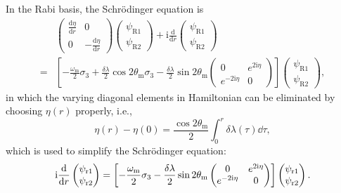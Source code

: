 In the Rabi basis, the Schr\"{o}dinger equation is
\begin{align*}
    &\begin{pmatrix}  \frac{\mathrm d\eta}{\mathrm dr}  & 0 \\ 0 & - \frac{\mathrm d\eta}{\mathrm d r}  \end{pmatrix} \begin{pmatrix} \psi_{\mathrm R1} \\ \psi_{\mathrm R2} \end{pmatrix} + \mathrm i \frac{\mathrm d}{\mathrm dr} \begin{pmatrix} \psi_{\mathrm R1} \\ \psi_{\mathrm R2} \end{pmatrix} \\
    =& \left[ -\frac{\omega_{\mathrm m} }{2} \sigma_3  + \frac{\delta \lambda}{2} \cos 2\theta_{\mathrm m}  \sigma_3  - \frac{\delta \lambda}{2} \sin 2\theta_{\mathrm m} \begin{pmatrix} 0 & e^{2\mathrm i\eta} \\ e^{-2 \mathrm i\eta } & 0 \end{pmatrix}   \right] \begin{pmatrix} \psi_{\mathrm R1} \\ \psi_{\mathrm R2} \end{pmatrix},
\end{align*}
in which the varying diagonal elements in Hamiltonian can be eliminated by choosing $\eta(r)$ properly, i.e.,
\begin{equation}
    \eta(r) - \eta(0) =  \frac{\cos 2\theta_{\mathrm{m}}}{2} \int_0^r \delta\lambda (\tau) \dd\tau,
\end{equation}
which is used to simplify the Schr\"{o}dinger equation:
\begin{equation}
    \ri \frac{\dd}{\dd r} \begin{pmatrix} \psi_{\mathrm r1} \\ \psi_{\mathrm r2} \end{pmatrix} = \left[ - \frac{\omega_{\mathrm m}}{2} \sigma_3 - \frac{\delta \lambda}{2} \sin 2\theta_{\mathrm m} \begin{pmatrix} 0 & e^{2\ri\eta} \\ e^{-2 \ri \eta } & 0 \end{pmatrix}\right] \begin{pmatrix} \psi_{\mathrm r1} \\ \psi_{\mathrm r2} \end{pmatrix}.
    \label{chap:matter-sec:jacobi-subsec:rabi-basis-eqn:eom-rabi-basis-matter}
\end{equation}

